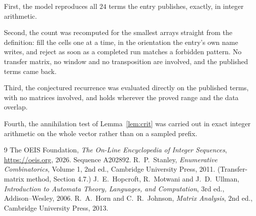 \documentclass[11pt,a4paper]{article}
\theoremstyle{plain}
\theoremstyle{definition}
\begin{document}
First, the model reproduces all $24$ terms the entry publishes, exactly, in integer
arithmetic.

Second, the count was recomputed for the smallest arrays straight from the definition: fill the
cells one at a time, in the orientation the entry's own name writes, and reject as soon as a
completed run matches a forbidden pattern. No transfer matrix, no window and no transposition
are involved, and the published terms came back.

Third, the conjectured recurrence was evaluated directly on the published terms, with no
matrices involved, and holds wherever the proved range and the data overlap.

Fourth, the annihilation test of Lemma~\ref{lem:crit} was carried out in exact integer
arithmetic on the whole vector rather than on a sampled prefix.

\begin{thebibliography}{9}
 The OEIS Foundation, \emph{The On-Line Encyclopedia of Integer
Sequences}, \url{https://oeis.org}, 2026. Sequence A202892.
 R.~P.~Stanley, \emph{Enumerative Combinatorics}, Volume 1, 2nd ed.,
Cambridge University Press, 2011. (Transfer-matrix method, Section 4.7.)
 J.~E.~Hopcroft, R.~Motwani and J.~D.~Ullman, \emph{Introduction to Automata
Theory, Languages, and Computation}, 3rd ed., Addison--Wesley, 2006.
 R.~A.~Horn and C.~R.~Johnson, \emph{Matrix Analysis}, 2nd ed., Cambridge
University Press, 2013.
\end{thebibliography}
\end{document}
